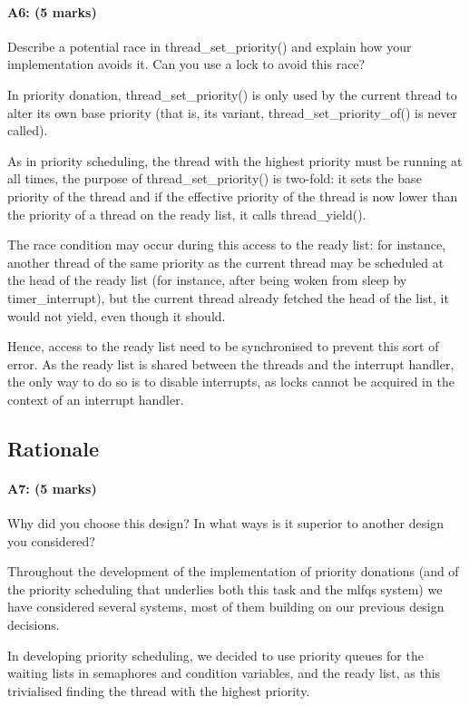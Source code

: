 \paragraph{A6: (5 marks)}
Describe a potential race in thread\_set\_priority() and explain how your implementation avoids it.  Can you use a lock to avoid this race?

In priority donation, thread\_set\_priority() is only used by the current thread to alter its own base priority (that is, its variant, thread\_set\_priority\_of() is never called).

As in priority scheduling, the thread with the highest priority must be running at all times, the purpose of thread\_set\_priority() is two-fold: it sets the base priority of the thread and if the effective priority of the thread is now lower than the priority of a thread on the ready list, it calls thread\_yield().

The race condition may occur during this access to the ready list: for instance, another thread of the same priority as the current thread may be scheduled at the head of the ready list (for instance, after being woken from sleep by timer\_interrupt), but the current thread already fetched the head of the list, it would not yield, even though it should.

Hence, access to the ready list need to be synchronised to prevent this sort of error. As the ready list is shared between the threads and the interrupt handler, the only way to do so is to disable interrupts, as locks cannot be acquired in the context of an interrupt handler.


\subsection{Rationale}
\paragraph{A7: (5 marks)}
Why did you choose this design?  In what ways is it superior to another design you considered?

Throughout the development of the implementation of priority donations (and of the priority scheduling that underlies both this task and the mlfqs system) we have considered several systems, most of them building on our previous design decisions.

In developing priority scheduling, we decided to use priority queues for the waiting lists in semaphores and condition variables, and the ready list, as this trivialised finding the thread with the highest priority.

